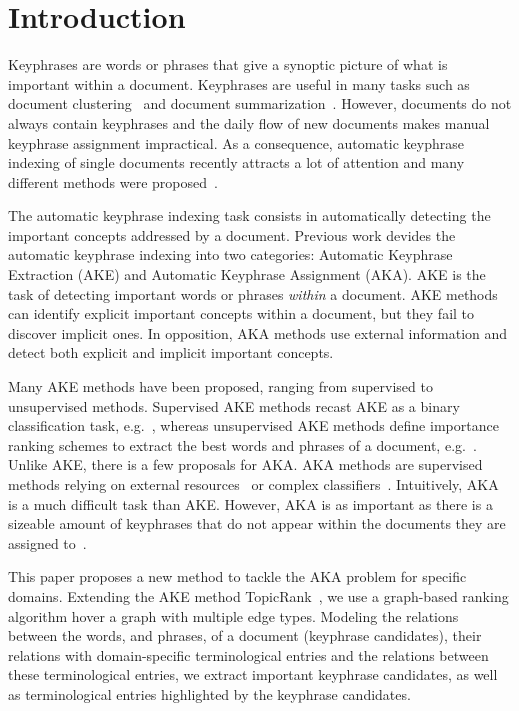 \section{Introduction}
\label{sec: introduction}
  Keyphrases are words or phrases that give a synoptic picture of what is
  important within a document. Keyphrases are useful in many tasks such as
  document clustering~\cite{han2007webdocumentclustering} and document
  summarization~\cite{litvak2008graphbased}. However, documents do not always
  contain keyphrases and the daily flow of new documents makes manual keyphrase
  assignment impractical. As a consequence, automatic keyphrase indexing of
  single documents recently attracts a lot of attention and many different
  methods were proposed~\cite{medelyan2006kea++,hasan2014state_of_the_art}.

  The automatic keyphrase indexing task consists in automatically detecting the
  important concepts addressed by a document. Previous work devides the
  automatic keyphrase indexing into two categories: Automatic Keyphrase
  Extraction (AKE) and Automatic Keyphrase Assignment (AKA). AKE is the task of
  detecting important words or phrases \emph{within} a document. AKE methods can
  identify explicit important concepts within a document, but they fail to
  discover implicit ones. In opposition, AKA methods use external information
  and detect both explicit and implicit important concepts.

  Many AKE methods have been proposed, ranging from supervised to unsupervised
  methods. Supervised AKE methods recast AKE as a binary classification task,
  e.g.~\cite{witten1999kea}, whereas unsupervised AKE methods define importance
  ranking schemes to extract the best words and phrases of a document,
  e.g.~\cite{mihalcea2004textrank}. Unlike AKE, there is a few proposals for
  AKA. AKA methods are supervised methods relying on external
  resources~\cite{medelyan2006kea++} or complex
  classifiers~\cite{liu2011vocabularygap}. Intuitively, AKA is a much difficult
  task than AKE. However, AKA is as important as there is a sizeable amount of
  keyphrases that do not appear within the documents they are assigned
  to~\cite[]{bougouin2013topicrank}.

  This paper proposes a new method to tackle the AKA problem for specific
  domains. Extending the AKE method TopicRank~\cite{bougouin2013topicrank}, we
  use a graph-based ranking algorithm hover a graph with multiple edge types.
  Modeling the relations between the words, and phrases, of a document
  (keyphrase candidates), their relations with domain-specific terminological
  entries and the relations between these terminological entries, we extract
  important keyphrase candidates, as well as terminological entries highlighted
  by the keyphrase candidates.
